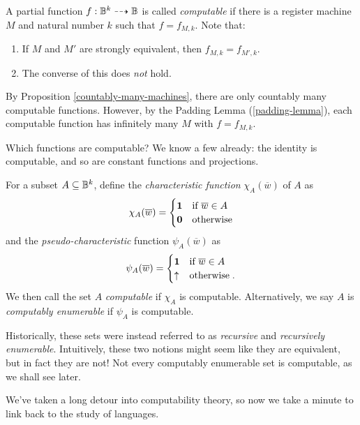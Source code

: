 \documentclass{article}
\begin{document}
\begin{definition}[Computable]
	A partial function $f: \mathbb{B}^k \dashrightarrow \mathbb{B}$ is called \textit{computable} if there is a register machine $M$ and natural number $k$ such that $f = f_{M,k}$. Note that:
	\begin{enumerate}
		\item If $M$ and $M'$ are strongly equivalent, then $f_{M,k} = f_{M',k}$.
		\item The converse of this does \textit{not} hold.
	\end{enumerate}
\end{definition}

By Proposition \ref{countably-many-machines}, there are only countably many computable functions. However, by the Padding Lemma (\ref{padding-lemma}), each computable function has infinitely many $M$ with $f = f_{M,k}$.

Which functions are computable? We know a few already: the identity is computable, and so are constant functions and projections.

\begin{definition}
	For a subset $A \subseteq \mathbb{B}^k$, define the \textit{characteristic function} $\chi_A(\overline w)$ of $A$ as
	\[
		\chi_A(\overline w) = \begin{cases}
		\textbf{1} & \text{if $\overline w \in A$} \\
		\textbf{0} & \!\mathrel{\, \text{otherwise}}
		\end{cases}
	\]
	and the \textit{pseudo-characteristic} function $\psi_A(\overline w)$ as
	\[
		\psi_A(\overline w) = \begin{cases}
		\textbf{1} & \text{if $\overline w \in A$} \\
		\uparrow & \!\mathrel{\, \text{otherwise}}.
		\end{cases}
	\]
	We then call the set $A$ \textit{computable} if $\chi_A$ is computable. Alternatively, we say $A$ is \textit{computably enumerable} if $\psi_A$ is computable.
\end{definition}

\begin{note}
	Historically, these sets were instead referred to as \textit{recursive} and \textit{recursively enumerable}. Intuitively, these two notions might seem like they are equivalent, but in fact they are not! Not every computably enumerable set is computable, as we shall see later.
\end{note}

We've taken a long detour into computability theory, so now we take a minute to link back to the study of languages.
\end{document}
